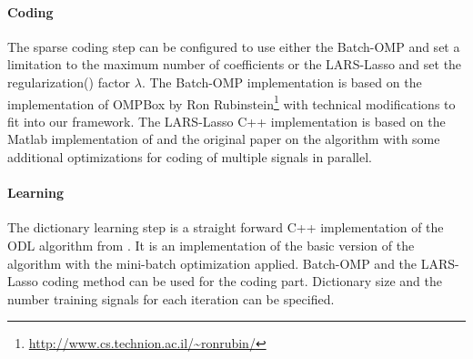\paragraph{Coding}
The sparse coding step can be configured to use either the Batch-OMP and 
set a limitation to the maximum number of coefficients or the LARS-Lasso 
and set the regularization() factor $\lambda$.
The Batch-OMP implementation is based on the implementation
of OMPBox by Ron
 Rubinstein\footnote{\url{http://www.cs.technion.ac.il/~ronrubin/}} with
technical modifications to fit into our
framework. The LARS-Lasso C++ implementation is based on the Matlab
implementation of\cite{Strand2005} and the original
paper\cite{Efron2004} on the algorithm with some additional optimizations
for coding of multiple signals in parallel. 

\paragraph{Learning}
The dictionary learning step is a straight forward C++ implementation of the
ODL algorithm from . It is an
implementation of the
basic version of the algorithm with the mini-batch optimization applied.
Batch-OMP and the LARS-Lasso coding method can be used for the coding part.
Dictionary size and the number training signals for each iteration can be
specified.

